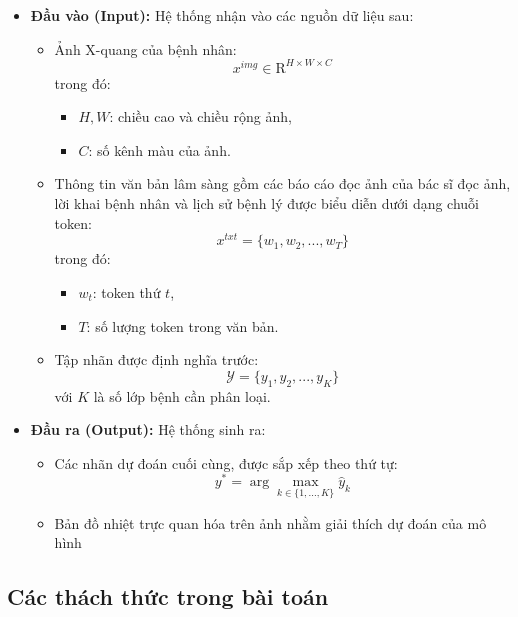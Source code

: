 \begin{itemize}
  \item \textbf{Đầu vào (Input):} Hệ thống nhận vào các nguồn dữ liệu sau:

  \begin{itemize}
    \item Ảnh X-quang của bệnh nhân:
    \[
        x^{img} \in \mathrm{R}^{H \times W \times C}
    \]
    trong đó:
    \begin{itemize}
        \item $H, W$: chiều cao và chiều rộng ảnh,
        \item $C$: số kênh màu của ảnh.
    \end{itemize}

    \pagebreak

    \item Thông tin văn bản lâm sàng gồm các báo cáo đọc ảnh của bác sĩ đọc ảnh, lời khai bệnh nhân và lịch sử bệnh lý được biểu diễn dưới dạng chuỗi token:
    \[
        x^{txt} = \{w_1, w_2, ..., w_T\}
    \]
    trong đó:
    \begin{itemize}
        \item $w_t$: token thứ $t$,
        \item $T$: số lượng token trong văn bản.
    \end{itemize}

    \item Tập nhãn được định nghĩa trước:
    \[
        \mathcal{Y} = \{y_1, y_2, ..., y_K\}
    \]
    với $K$ là số lớp bệnh cần phân loại.
  \end{itemize}

  \item \textbf{Đầu ra (Output):} Hệ thống sinh ra:

  \begin{itemize}
    \item Các nhãn dự đoán cuối cùng, được sắp xếp theo thứ tự:
    \[
        y^{*} = \arg\max_{k \in \{1,...,K\}} \hat{y}_k
    \]

    \item Bản đồ nhiệt trực quan hóa trên ảnh nhằm giải thích dự đoán của mô hình
  \end{itemize}
\end{itemize}

\subsection{Các thách thức trong bài toán}

